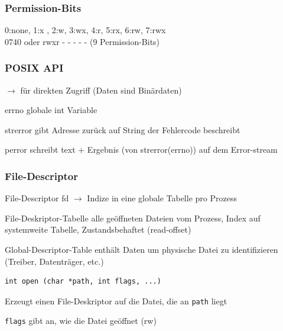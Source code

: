 \begin{multicols*}{5}
    \subsubsection{Permission-Bits}
        0:none, 1:x , 2:w, 3:wx, 4:r, 5:rx, 6:rw, 7:rwx\\
		0740 oder rwxr - - - - - (9 Permission-Bits)








	\subsubsection{POSIX API}
	$\rightarrow$ für direkten Zugriff (Daten sind Binärdaten)
	
	\begin{compactitem}[$\bullet$]
		\item \textcolor{h}{errno} globale int Variable
		\item \textcolor{h}{strerror} gibt \textcolor{h}{Adresse} zurück auf String der Fehlercode beschreibt
		\item \textcolor{h}{perror} schreibt text + Ergebnis (von strerror(errno)) auf dem Error-stream
	\end{compactitem}
		
	\subsubsection{File-Descriptor}
		\begin{compactitem}[$\bullet$]
			\item \textcolor{h}{File-Descriptor} fd $\rightarrow$ Indize in eine globale Tabelle pro Prozess
			\item \textcolor{h}{File-Deskriptor-Tabelle} alle geöffneten Dateien vom Prozess, Index auf systemweite Tabelle, Zustandsbehaftet (read-offset)
			\item \textcolor{h}{Global-Descriptor-Table} enthält Daten um physische Datei zu identifizieren (Treiber, Datenträger, etc.)
		\end{compactitem}
		
		\vspace{-6pt}
		\begin{lstlisting}
int open (char *path, int flags, ...)
		\end{lstlisting}
		\vspace{-6pt}
		\begin{compactitem}[$\bullet$]
			\item Erzeugt einen File-Deskriptor auf die Datei, die an \texttt{path} liegt
			\item \texttt{flags} gibt an, wie die Datei geöffnet (rw)
		\end{compactitem}
		

\end{multicols*}
